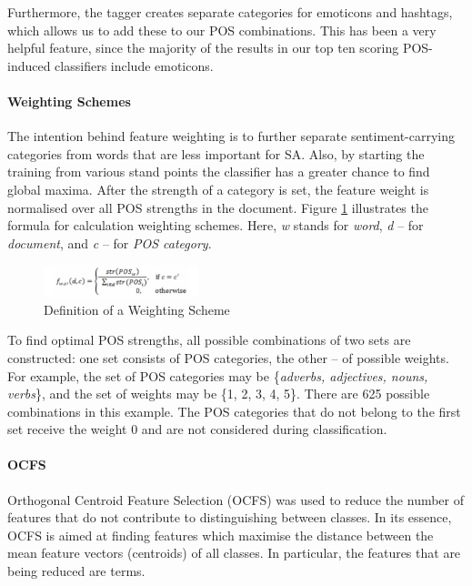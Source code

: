 \documentclass[titlepage]{article}
\begin{document}
Furthermore, the tagger creates separate categories for emoticons and hashtags, which allows us to add these to our POS combinations. This has been a very helpful feature, since the majority of the results in our top ten scoring POS-induced classifiers include emoticons.
      
      \paragraph{Weighting Schemes} 
      
      The intention behind feature weighting is to further separate sentiment-carrying categories from words that are less important for SA. Also, by starting the training from various stand points the classifier has a greater chance to find global maxima. After the strength of a category is set, the feature weight is normalised over all POS strengths in the document. Figure \ref{weight} illustrates the formula for calculation weighting schemes. Here, \textit{w} stands for \textit{word}, \textit{d} -- for \textit{document}, and \textit{c} -- for \textit{POS category}.
      
      \begin{figure}[h!]
\centering
\includegraphics[width=0.4\textwidth]{pics/weight.jpeg}
\caption{Definition of a Weighting Scheme}
\label{weight}
\end{figure}

      
      To find optimal POS strengths, all possible combinations of two sets are constructed: one set consists of POS categories, the other -- of possible weights. For example, the set of POS categories may be \{\textit{adverbs, adjectives, nouns, verbs}\}, and the set of weights may be \{1, 2, 3, 4, 5\}. There are 625 possible combinations in this example. The POS categories that do not belong to the first set receive the weight 0 and are not considered during classification. 
     
     
      \paragraph{OCFS} Orthogonal Centroid Feature Selection (OCFS) was used to reduce the number of features that do not contribute to distinguishing between classes. In its essence, OCFS is aimed at finding features which maximise the distance between the mean feature vectors (centroids) of all classes. In particular, the features that are being reduced are terms.
      
\end{document}
